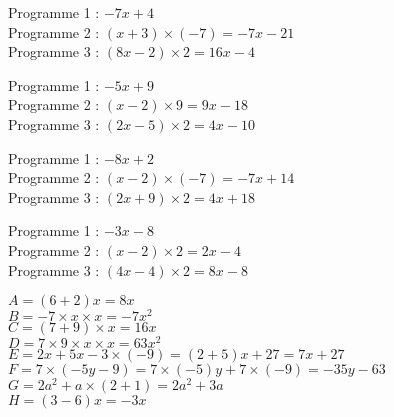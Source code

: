 \documentclass[a4paper,11pt,fleqn]{article}		%
\begin{document}
\setcounter{exo}{0}
\vfill
\begin{correction}
\begin{multicols}{2}
%
%


Programme 1 : $-7 x +4$\\
Programme 2 : $(x +3)\times (-7)= -7  x  -21 $\\
Programme 3 : $( 8 x -2 )\times 2= 16 x -4$


Programme 1 : $-5 x +9$\\
Programme 2 : $(x -2)\times 9= 9  x  -18 $\\
Programme 3 : $( 2 x -5 )\times 2= 4 x -10$


Programme 1 : $-8 x +2$\\
Programme 2 : $(x -2)\times (-7)= -7  x  +14 $\\
Programme 3 : $( 2 x +9 )\times 2= 4 x +18$


Programme 1 : $-3 x -8$\\
Programme 2 : $(x -2)\times 2= 2  x  -4 $\\
Programme 3 : $( 4 x -4 )\times 2= 8 x -8$



$A=(6  +2) x=8 x$\\
$B=-7 \times x\times x=-7 x^2$\\
$C=(7 +9) \times x=16  x$\\
$D=7\times 9\times x\times x=63 x^2$\\
$E= 2  x +5 x -3\times (-9) = (2  +5) x +27 = 7 x +27 $\\
$F=7 \times (-5y -9)  =7 \times (-5)y +7 \times (-9)
 =-35y -63 $\\
$G=2 a^2+a\times (2+ 1)=2 a^2+3a$\\
$H= (3 -6)x = -3x$


\end{multicols}
\end{correction}
\end{document}
